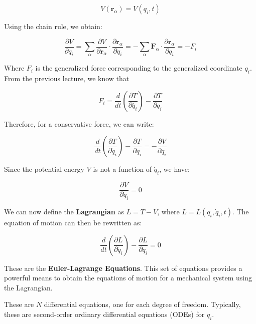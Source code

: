 \begin{equation}
    V(\mathbf{r}_\alpha)=V(q_i, t)
\end{equation}

Using the chain rule, we obtain:

\begin{equation}
    \frac{\partial V}{\partial q_i}=\sum_\alpha \frac{\partial V}{\partial \mathbf{r}_\alpha} \cdot \frac{\partial \mathbf{r}_\alpha}{\partial q_i}=-\sum_\alpha \mathbf{F}_\alpha \cdot \frac{\partial \mathbf{r}_\alpha}{\partial q_i}=-F_i
\end{equation}

Where $F_i$ is the generalized force corresponding to the generalized coordinate $q_i$.
From the previous lecture, we know that

\begin{equation}
   F_i = \frac{d}{dt} \left(\frac {\partial T}{\partial \dot{q_i}}\right) - \frac{\partial T}{\partial q_i}
\end{equation}

Therefore, for a conservative force, we can write:

\begin{equation}
    \frac{d}{dt} \left(\frac{\partial T}{\partial \dot{q}_i}\right) - \frac{\partial T}{\partial q_i} = -\frac{\partial V}{\partial q_i}
\end{equation}

Since the potential energy $V$ is not a function of $\dot{q}_i$, we have:

\begin{equation}
    \frac{\partial V}{\partial \dot{q}_i}=0
\end{equation}

We can now define the \textbf{Lagrangian} as $L = T - V$, where 
$L = L(q_i, \dot{q}_i, t)$. The equation of motion can then be rewritten as:

\begin{equation}
    \frac{d}{dt} \left(\frac{\partial L}{\partial \dot{q}_i}\right) - \frac{\partial L}{\partial q_i} = 0
\end{equation}

These are the \textbf{Euler-Lagrange Equations}. This set of equations provides a 
powerful means to obtain the equations of motion for a mechanical system using the 
Lagrangian.

These are $N$ differential equations, one for each degree of freedom. Typically, these 
are second-order ordinary differential equations (ODEs) for $q_i$.

